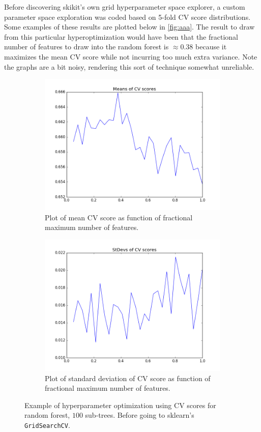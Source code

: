 \documentclass[10pt]{article}
\begin{document}
Before discovering skikit's own grid hyperparameter space explorer, a custom parameter space exploration was coded based on 5-fold CV score distributions. Some examples of these results are plotted below in \autoref{fig:aaa}. The result to draw from this particular hyperoptimization would have been that the fractional number of features to draw into the random forest is $\approx 0.38$ because it maximizes the mean CV score while not incurring too much extra variance. Note the graphs are a bit noisy, rendering this sort of technique somewhat unreliable.
\begin{figure}[!h]
    \centering
    \begin{subfigure}{0.3\textwidth}
        \centering
        \includegraphics[width=\textwidth]{images/testRFMaxFeatMeans.png}
        \caption{Plot of mean CV score as function of fractional maximum number of features.}
    \end{subfigure}
    \begin{subfigure}{0.3\textwidth}
        \centering
        \includegraphics[width=\textwidth]{images/testRFMaxFeatStDevs.png}
        \caption{Plot of standard deviation of CV score as function of fractional maximum number of features.}
    \end{subfigure}
    \caption{Example of hyperparameter optimization using CV scores for random forest, $100$ sub-trees. Before going to sklearn's \texttt{GridSearchCV}.}
    \label{fig:aaa}
\end{figure}
\end{document}
